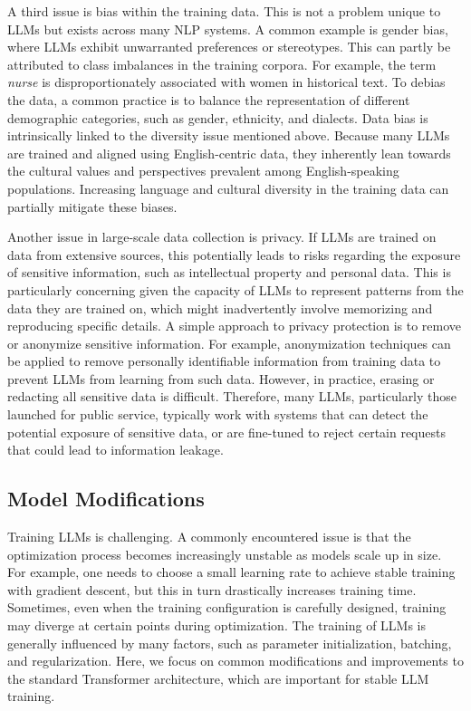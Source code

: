 A third issue is bias within the training data. This is not a problem unique to LLMs but exists across many NLP systems. A common example is gender bias, where LLMs exhibit unwarranted preferences or stereotypes. This can partly be attributed to class imbalances in the training corpora. For example, the term \textit{nurse} is disproportionately associated with women in historical text. To debias the data, a common practice is to balance the representation of different demographic categories, such as gender, ethnicity, and dialects. Data bias is intrinsically linked to the diversity issue mentioned above. Because many LLMs are trained and aligned using English-centric data, they inherently lean towards the cultural values and perspectives prevalent among English-speaking populations. Increasing language and cultural diversity in the training data can partially mitigate these biases.

Another issue in large-scale data collection is privacy. If LLMs are trained on data from extensive sources, this potentially leads to risks regarding the exposure of sensitive information, such as intellectual property and personal data. This is particularly concerning given the capacity of LLMs to represent patterns from the data they are trained on, which might inadvertently involve memorizing and reproducing specific details. A simple approach to privacy protection is to remove or anonymize sensitive information. For example, anonymization techniques can be applied to remove personally identifiable information from training data to prevent LLMs from learning from such data. However, in practice, erasing or redacting all sensitive data is difficult. Therefore, many LLMs, particularly those launched for public service, typically work with systems that can detect the potential exposure of sensitive data, or are fine-tuned to reject certain requests that could lead to information leakage.

\subsection{Model Modifications}

\noindent Training LLMs is challenging. A commonly encountered issue is that the optimization process becomes increasingly unstable as models scale up in size. For example, one needs to choose a small learning rate to achieve stable training with gradient descent, but this in turn drastically increases training time. Sometimes, even when the training configuration is carefully designed, training may diverge at certain points during optimization. The training of LLMs is generally influenced by many factors, such as parameter initialization, batching, and regularization. Here, we focus on common modifications and improvements to the standard Transformer architecture, which are important for stable LLM training.

